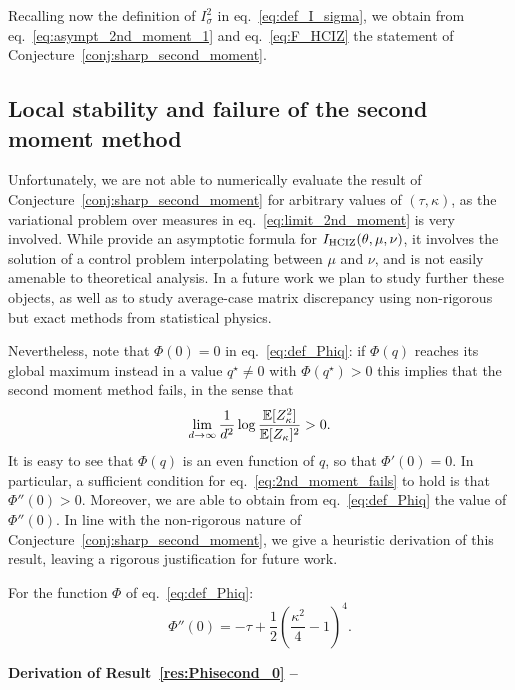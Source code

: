 \myskip 
Recalling now the definition of $I_\sigma^2$ in eq.~\eqref{eq:def_I_sigma}, we obtain from eq.~\eqref{eq:asympt_2nd_moment_1} 
and eq.~\eqref{eq:F_HCIZ} the statement of Conjecture~\ref{conj:sharp_second_moment}.

\subsection{Local stability and failure of the second moment method}\label{subsec:fail_second_moment}

Unfortunately, we are not able to numerically evaluate the result of Conjecture~\ref{conj:sharp_second_moment} 
for arbitrary values of $(\tau, \kappa)$, as the variational problem over measures in eq.~\eqref{eq:limit_2nd_moment} is very involved. 
While \cite{matytsin1994large,guionnet2002large} provide an asymptotic formula for $I_{\mathrm{HCIZ}}(\theta, \mu, \nu)$, it involves the solution of a control problem interpolating between 
$\mu$ and $\nu$, and is not easily amenable to theoretical analysis. 
In a future work we plan to study further these objects, as well as to study average-case matrix discrepancy using non-rigorous but exact methods from statistical physics.

\myskip 
Nevertheless, note that $\Phi(0) = 0$ in eq.~\eqref{eq:def_Phiq}: 
if $\Phi(q)$ reaches its global maximum instead in a value $q^\star \neq 0$ with $\Phi(q^\star) > 0$ 
this implies that the second moment method fails, in the sense that 
\begin{equation}\label{eq:2nd_moment_fails}
    \lim_{d \to \infty}\frac{1}{d^2} \log \frac{\mathbb{E}[Z_\kappa^2]}{\mathbb{E}[Z_\kappa]^2} > 0.
\end{equation} 
It is easy to see that $\Phi(q)$ is an even function of $q$, so that $\Phi'(0) = 0$.
In particular, a sufficient condition for eq.~\eqref{eq:2nd_moment_fails} to hold is 
that $\Phi''(0) > 0$.
Moreover, we are able to obtain from eq.~\eqref{eq:def_Phiq} the value of $\Phi''(0)$.
In line with the non-rigorous nature of Conjecture~\ref{conj:sharp_second_moment}, we give 
a heuristic derivation of this result, leaving a rigorous justification for future work.
\begin{result}\label{res:Phisecond_0}
    For the function $\Phi$ of eq.~\eqref{eq:def_Phiq}: 
    \begin{equation}\label{eq:Phisecond_0}
        \Phi''(0) = - \tau + \frac{1}{2} \left(\frac{\kappa^2}{4} - 1\right)^4.
    \end{equation}
\end{result}



\myskip 
\textbf{Derivation of Result~\ref{res:Phisecond_0} --}
